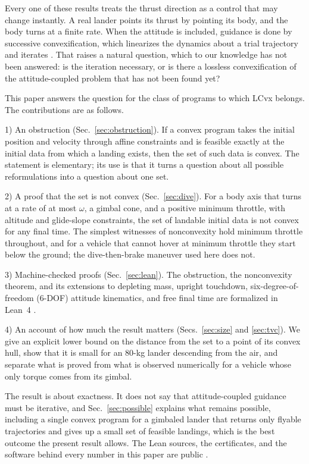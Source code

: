 Every one of these results treats the thrust direction as a control that may change instantly. A real lander points its
thrust by pointing its body, and the body turns at a finite rate. When the attitude is included, guidance is done by
successive convexification, which linearizes the dynamics about a trial trajectory and iterates
\cite{mao2016,szmuk2018,szmuk2020}. That raises a natural question, which to our knowledge has not been answered: is the
iteration necessary, or is there a lossless convexification of the attitude-coupled problem that has not been found yet?

This paper answers the question for the class of programs to which LCvx belongs. The contributions are as follows.

1) An obstruction (Sec.~\ref{sec:obstruction}). If a convex program takes the initial position and velocity through affine
constraints and is feasible exactly at the initial data from which a landing exists, then the set of such data is convex.
The statement is elementary; its use is that it turns a question about all possible reformulations into a question about one
set.

2) A proof that the set is not convex (Sec.~\ref{sec:dive}). For a body axis that turns at a rate of at most $\omega$, a
gimbal cone, and a positive minimum throttle, with altitude and glide-slope constraints, the set of landable initial data is
not convex for any final time. The simplest witnesses of nonconvexity hold minimum throttle throughout, and for a vehicle
that cannot hover at minimum throttle they start below the ground; the dive-then-brake maneuver used here does not.

3) Machine-checked proofs (Sec.~\ref{sec:lean}). The obstruction, the nonconvexity theorem, and its extensions to depleting
mass, upright touchdown, six-degree-of-freedom (6-DOF) attitude kinematics, and free final time are formalized in Lean~4
\cite{lean4,mathlib}.

4) An account of how much the result matters (Secs.~\ref{sec:size} and \ref{sec:tvc}). We give an explicit lower bound on the
distance from the set to a point of its convex hull, show that it is small for an 80-kg lander descending from the air,
and separate what is proved from what is observed numerically for a vehicle whose only torque comes from its gimbal.

The result is about exactness. It does not say that attitude-coupled guidance must be iterative, and Sec.~\ref{sec:possible}
explains what remains possible, including a single convex program for a gimbaled lander that returns only flyable
trajectories and gives up a small set of feasible landings, which is the best outcome the present result allows. The Lean
sources, the certificates, and the software behind every number in this paper are public \cite{repo}.

